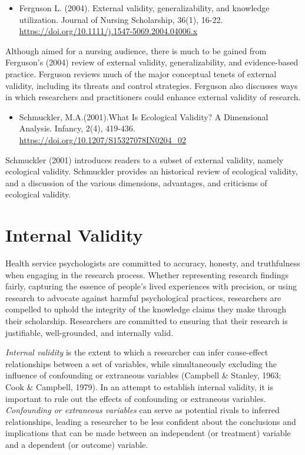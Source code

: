 \documentclass[
  11pt,
]{book}
\providecommand{\tightlist}{%
  \setlength{\itemsep}{0pt}\setlength{\parskip}{0pt}}
\begin{document}
\begin{itemize}
\tightlist
\item
  Ferguson L. (2004). External validity, generalizability, and knowledge utilization. Journal of Nursing Scholarship, 36(1), 16-22. \url{https://doi.org/10.1111/j.1547-5069.2004.04006.x}
\end{itemize}

Although aimed for a nursing audience, there is much to be gained from Ferguson's (2004) review of external validity, generalizability, and evidence-based practice. Ferguson reviews much of the major conceptual tenets of external validity, including its threats and control strategies. Ferguson also discusses ways in which researchers and practitioners could enhance external validity of research.

\begin{itemize}
\tightlist
\item
  Schmuckler, M.A.(2001).What Is Ecological Validity? A Dimensional Analysis. Infancy, 2(4), 419-436. \url{https://doi.org/10.1207/S15327078IN0204_02}
\end{itemize}

Schmuckler (2001) introduces readers to a subset of external validity, namely ecological validity. Schmuckler provides an historical review of ecological validity, and a discussion of the various dimensions, advantages, and criticisms of ecological validity.

\hypertarget{internal-validity}{%
\section{Internal Validity}\label{internal-validity}}

Health service psychologists are committed to accuracy, honesty, and truthfulness when engaging in the research process. Whether representing research findings fairly, capturing the essence of people's lived experiences with precision, or using research to advocate against harmful psychological practices, researchers are compelled to uphold the integrity of the knowledge claims they make through their scholarship. Researchers are committed to ensuring that their research is justifiable, well-grounded, and internally valid.

\emph{Internal validity} is the extent to which a researcher can infer cause-effect relationships between a set of variables, while simultaneously excluding the influence of confounding or extraneous variables (Campbell \& Stanley, 1963; Cook \& Campbell, 1979). In an attempt to establish internal validity, it is important to rule out the effects of confounding or extraneous variables. \emph{Confounding or extraneous variables} can serve as potential rivals to inferred relationships, leading a researcher to be less confident about the conclusions and implications that can be made between an independent (or treatment) variable and a dependent (or outcome) variable.
\end{document}

